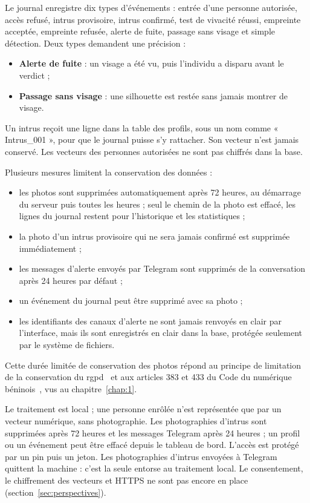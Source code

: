 Le journal enregistre dix types d'événements : entrée d'une personne autorisée, accès refusé, intrus provisoire, intrus confirmé, test de vivacité réussi, empreinte acceptée, empreinte refusée, alerte de fuite, passage sans visage et simple détection. Deux types demandent une précision :
\begin{itemize}
  \item \textbf{Alerte de fuite} : un visage a été vu, puis l'individu a disparu avant le verdict ;
  \item \textbf{Passage sans visage} : une silhouette est restée sans jamais montrer de visage.
\end{itemize}
Un intrus reçoit une ligne dans la table des profils, sous un nom comme « Intrus\_001 », pour que le journal puisse s'y rattacher. Son vecteur n'est jamais conservé. Les vecteurs des personnes autorisées ne sont pas chiffrés dans la base.

Plusieurs mesures limitent la conservation des données :
\begin{itemize}
  \item les photos sont supprimées automatiquement après 72 heures, au démarrage du serveur puis toutes les heures ; seul le chemin de la photo est effacé, les lignes du journal restent pour l'historique et les statistiques ;
  \item la photo d'un intrus provisoire qui ne sera jamais confirmé est supprimée immédiatement ;
  \item les messages d'alerte envoyés par Telegram sont supprimés de la conversation après 24 heures par défaut ;
  \item un événement du journal peut être supprimé avec sa photo ;
  \item les identifiants des canaux d'alerte ne sont jamais renvoyés en clair par l'interface, mais ils sont enregistrés en clair dans la base, protégée seulement par le système de fichiers.
\end{itemize}
Cette durée limitée de conservation des photos répond au principe de limitation de la conservation du \gls{rgpd}~\cite{ue2016rgpd} et aux articles 383 et 433 du Code du numérique béninois~\cite{apdp2018codenumerique}, vus au chapitre~\ref{chap:1}.

\begin{nouv}
Le traitement est local ; une personne enrôlée n'est représentée que par un vecteur numérique, sans photographie. Les photographies d'intrus sont supprimées après 72 heures et les messages Telegram après 24 heures ; un profil ou un événement peut être effacé depuis le tableau de bord. L'accès est protégé par un \gls{pin} puis un jeton. Les photographies d'intrus envoyées à Telegram quittent la machine : c'est la seule entorse au traitement local. Le consentement, le chiffrement des vecteurs et HTTPS ne sont pas encore en place (section~\ref{sec:perspectives}).
\end{nouv}

